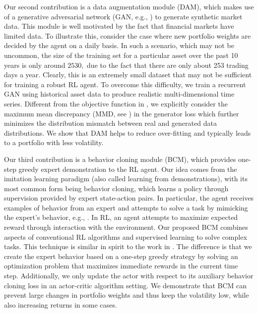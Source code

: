 \documentclass{article}
\begin{document}
Our second contribution is a data augmentation module (DAM), which makes use of a generative adversarial network (GAN, e.g., \cite{goodfellow2014generative}) to generate synthetic market data. This module is well motivated by the fact that financial markets have limited data. To illustrate this, consider the case where new portfolio weights are decided by the agent on a daily basis. In such a scenario, which may not be uncommon, the size of the training set for a particular asset over the past 10 years is only around $2530,$ due to the fact that there are only about 253 trading days a year. Clearly, this is an extremely small dataset that may not be sufficient for training a robust RL agent. To overcome this difficulty, we train a recurrent GAN \cite{esteban2017real} using historical asset data to produce realistic multi-dimensional time series. Different from the objective {function} in \cite{goodfellow2014generative}, we explicitly consider the maximum mean discrepancy (MMD, see \cite{gretton2007kernel}) in the generator loss which further minimizes the distribution mismatch between real and generated data distributions. We show that DAM helps to reduce over-fitting and typically leads to {a} portfolio with less volatility. 

Our third contribution is a behavior cloning module (BCM), which provides one-step greedy {expert} demonstration to the RL agent. Our idea comes from the imitation learning {paradigm} (also called learning from demonstrations), with its most common form {being} behavior cloning, which learns a policy through {supervision provided by expert state-action pairs}. In particular, the agent receives examples of behavior from an expert and attempts to solve a task by mimicking the expert's behavior, e.g., \cite{bain1999framework, abbeel2004apprenticeship, ross2011reduction}. In RL, an agent attempts to maximize expected reward through interaction with the environment. Our proposed BCM combines aspects of conventional RL algorithms and supervised learning to solve complex tasks. This technique is similar in spirit to {the work in} \cite{nair2018overcoming}. The difference is that we create the expert behavior based on a one-step greedy strategy by solving an optimization problem that maximizes immediate rewards in the current time step. Additionally, we only update the actor with respect to its auxiliary behavior cloning loss in {an actor-critic algorithm} setting. We demonstrate that BCM can {prevent large changes in} portfolio weights and thus keep the volatility low, while also increasing returns in some cases.
\end{document}
